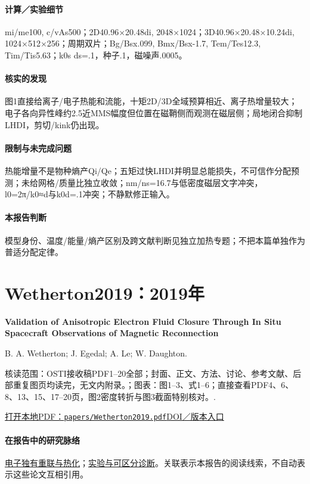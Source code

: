 \documentclass[UTF8,a4paper,11pt,openany,fontset=fandol]{ctexbook}
\begin{document}
\paragraph{计算／实验细节}mi/me100, c/vAs500；2D40.96×20.48di, 2048×1024；3D40.96×20.48×10.24di, 1024×512×256；周期双片；Bg/Bsx.099, Bmx/Bsx-1.7, Tem/Tes12.3, Tim/Tis5.63；k0s ds=.1，种子.1，磁噪声.0005。

\paragraph{核实的发现}图1直接给离子/电子热能和流能，十矩2D/3D全域预算相近、离子热增量较大；电子各向异性峰约2.5近MMS幅度但位置在磁鞘侧而观测在磁层侧；局地闭合抑制LHDI，剪切/kink仍出现。

\paragraph{限制与未完成问题}热能增量不是物种熵产Qi/Qe；五矩过快LHDI并明显总能损失，不可信作分配预测；未给网格/质量比独立收敛；nm/ns=16.7与低密度磁层文字冲突，l0=2π/k0≈d与k0d=.1冲突；不静默修正输入。

\paragraph{本报告判断}模型身份、温度/能量/熵产区别及跨文献判断见独立加热专题；不把本篇单独作为普适分配定律。

\section{Wetherton2019：2019年}\label{paper:Wetherton2019}

\textbf{Validation of Anisotropic Electron Fluid Closure Through In Situ Spacecraft Observations of Magnetic Reconnection}\citep{Wetherton2019}\

B. A. Wetherton;  J. Egedal;  A. Le;  W. Daughton.

\textsf{核读范围：}OSTI接收稿PDF1–20全部；封面、正文、方法、讨论、参考文献、后部重复图页均读完，无文内附录。；\textsf{图表：}图1–3、式1–6；直接查看PDF4、6、8、13、15、17–20页，图2密度转折与图3截面特别核对。.

\href{run:../papers/Wetherton2019.pdf}{打开本地PDF：\texttt{papers/Wetherton2019.pdf}}\quad\href{https://doi.org/10.1029/2019GL083119}{DOI／版本入口}

\paragraph{在报告中的研究脉络}\hyperref[story:energy]{电子独有重联与热化}；\hyperref[story:diagnostic]{实验与可区分诊断}。关联表示本报告的阅读线索，不自动表示这些论文互相引用。
\end{document}
